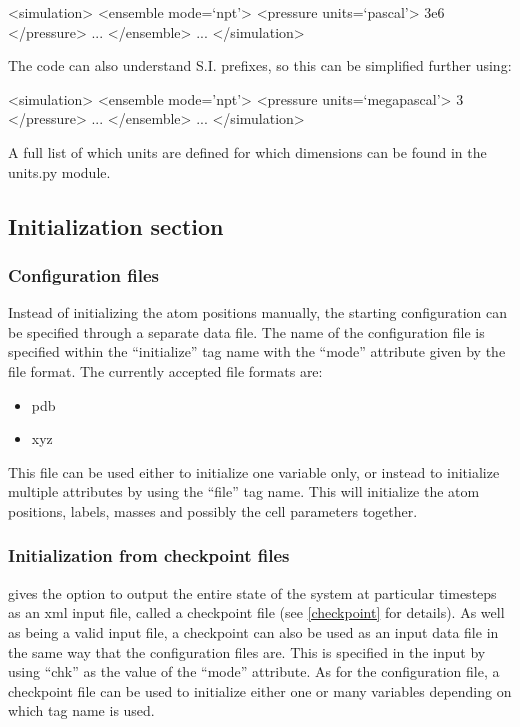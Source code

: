 \documentclass[11pt,english,fleqn]{report}
\newenvironment{code}{%
\footnotesize 
\verbatim
}{
\endverbatim
\normalsize
}
\begin{document}
\begin{code}
<simulation>
   <ensemble mode=`npt'>
      <pressure units=`pascal'> 3e6 </pressure>
      ...
   </ensemble>
   ...
</simulation>
\end{code}

The code can also understand S.I. prefixes, so this can be simplified
further using:

\begin{code}
<simulation>
   <ensemble mode='npt'>
      <pressure units=`megapascal'> 3 </pressure>
      ...
   </ensemble>
   ...
</simulation>
\end{code}

A full list of which units are defined for which dimensions
can be found in the units.py module.


\subsection{Initialization section}


\subsubsection{Configuration files}

\label{configfile}


Instead of initializing the atom positions manually, the starting
configuration can be specified through a separate data file. The name
of the configuration file is specified within the {}``initialize''
tag name with the {}``mode'' attribute given by the file format.
The currently accepted file formats are:
\begin{itemize}
\item pdb
\item xyz
\end{itemize}
This file can be used either to initialize one variable only, or instead
to initialize multiple attributes by using the {}``file'' tag name.
This will initialize the atom positions, labels, masses and possibly
the cell parameters together.


\subsubsection{Initialization from checkpoint files}


\ipi gives the option to output the entire state of the system at
particular timesteps as an xml input file, called a checkpoint file
(see \ref{checkpoint} for details). As well as being a valid input
file, a checkpoint can also be used as an input data file in the same
way that the configuration files are. This is specified in the input
by using {}``chk'' as the value of the {}``mode'' attribute. As
for the configuration file, a checkpoint file can be used to initialize
either one or many variables depending on which tag name is used.
\end{document}
